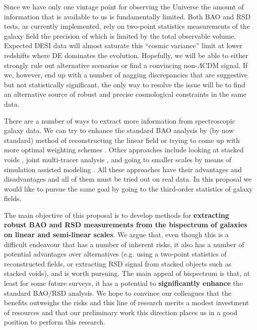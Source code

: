 Since we have only one vintage point for observing the Universe the amount of
information that is  available to us is fundamentally limited. Both BAO and RSD
tests, as currently implemented, rely on two-point statistics measurements of
the galaxy field the precision of which is limited by the total  observable
volume.  Expected DESI data will almost saturate this ``cosmic variance'' limit
at lower redshifts where DE dominates the evolution. Hopefully, we will be able
to either strongly rule out alternative scenarios or find a convincing
non-$\Lambda$CDM signal. If we, however, end up with a number of nagging
discrepancies that are suggestive but not statistically significant, the only
way to resolve the issue will be to find an alternative source of robust and
precise cosmological constraints in the same data.

There are a number of ways to extract more information from spectroscopic
galaxy data. We can try to enhance the standard BAO analysis by (by now
standard) method of reconstructing the linear field
\cite{2007ApJ...664..675E,2009PhRvD..79f3523P,2009PhRvD..80l3501N,2012MNRAS.427.2132P}
or trying to come up with more optimal weighting schemes
\cite{2016MNRAS.463.2708P,2015MNRAS.451..236Z,2017MNRAS.464.2698R}. Other
approaches include looking at stacked voids
\cite{2013MNRAS.436.3480P,2015MNRAS.451.1036C,2015JCAP...11..036H,2016PhRvL.117i1302H,2016MNRAS.462.2465C,2017JCAP...07..014H},
joint multi-tracer analysis
\cite{2009PhRvL.102b1302S,2009PhRvL.103i1303S,2009JCAP...10..007M}, and going
to smaller scales by means of simulation assisted modeling \cite{2014MNRAS.444..476R,2015ApJ...810...35K,2018arXiv180405867Z}.  All these
approaches have their advantages and disadvantages and all of them must be
tried out on real data. In this proposal we would like to pursue the same goal
by going to the third-order statistics of galaxy fields.

The main objective of this proposal is to develop methods for
\textbf{extracting robust BAO and RSD measurements from the  bispectrum of
galaxies on linear and semi-linear scales}. We argue that, even though this is
a difficult  endeavour that has a number of inherent risks, it also has a
number of potential advantages over alternatives (e.g.  using a two-point
statistics of reconstructed fields, or extracting RSD signal from stacked
objects such as stacked voids), and is worth pursuing. The main appeal of
bispectrum is that, at least for some future surveys, it has a potential to
\textbf{significantly enhance} the standard BAO/RSD analysis. We hope to
convince our colleagues that the benefits outweighs the risks and this line of
research merits a modest investment of resources and that our preliminary work
this direction places us in a good position  to perform this research. 

